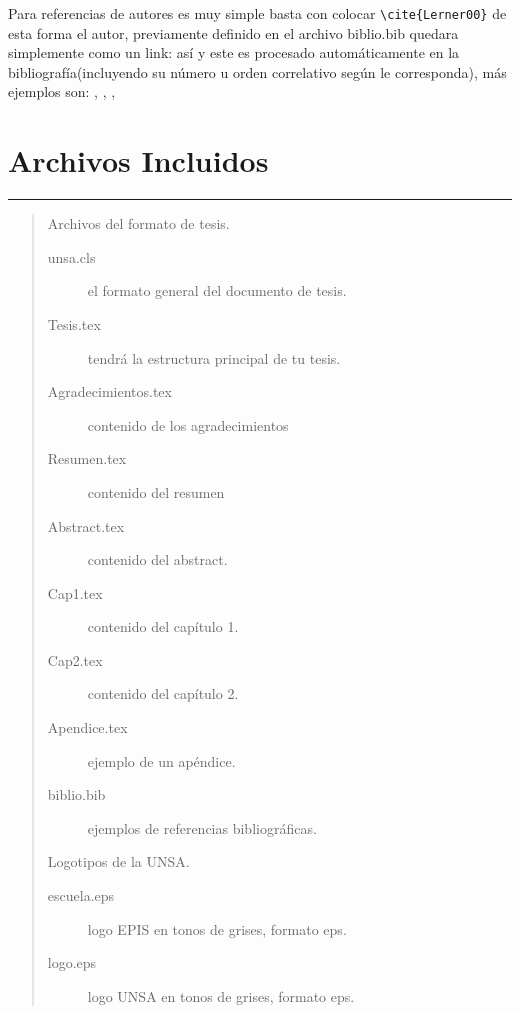 Para referencias de autores es muy simple basta con colocar
\verb"\cite{Lerner00}" de esta forma el autor, previamente definido
en el archivo biblio.bib quedara simplemente como un link: así
\cite{Lerner00} y este es procesado automáticamente en la
bibliografía(incluyendo su número u orden correlativo según le
corresponda), más ejemplos son: \cite{Abiteboul91}, \cite{Batini86},
\cite{Bertino92}, \cite{Atkinson89}


\chapter{Archivos Incluidos}
\hrule \bigskip  \vspace*{1cm}

\begin{quote}

Archivos del formato de tesis.

\begin{description}
    \item[unsa.cls] el formato general del documento de tesis.
    \item[Tesis.tex] tendrá la estructura principal de tu tesis.
    \item[Agradecimientos.tex] contenido de los agradecimientos
    \item[Resumen.tex] contenido del resumen
    \item[Abstract.tex] contenido del  abstract.
    \item[Cap1.tex] contenido del capítulo 1.
    \item[Cap2.tex] contenido del capítulo 2.
    \item[Apendice.tex] ejemplo de un apéndice.
    \item[biblio.bib] ejemplos de referencias bibliográficas.
\end{description}

Logotipos de la UNSA.

\begin{description}
    \item[escuela.eps] logo EPIS en tonos de grises, formato eps.
    \item[logo.eps] logo UNSA en tonos de grises, formato eps.
\end{description}

\end{quote}
